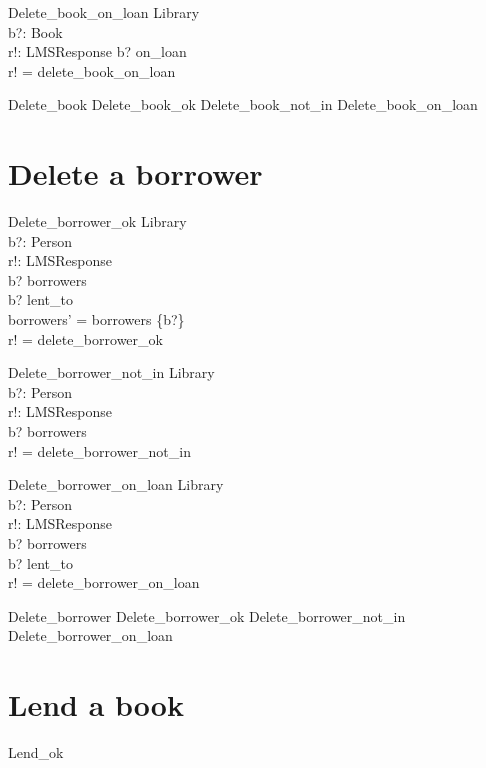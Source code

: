 \documentclass[11pt, fuzz]{article}
\begin{document}
\begin{schema}{Delete\_book\_on\_loan}
    \Xi Library     \\
    b?: Book        \\
    r!: LMSResponse
\where
    b? \in on\_loan             \\
    r! = delete\_book\_on\_loan \\
\end{schema}

\begin{zed}
    Delete\_book  Delete\_book\_ok \lor Delete\_book\_not\_in \lor Delete\_book\_on\_loan
\end{zed}


\section{Delete a borrower}


\begin{schema}{Delete\_borrower\_ok}
    \Delta Library  \\
    b?: Person      \\
    r!: LMSResponse \\
\where
    b? \in borrowers                        \\
    b? \notin \ran lent\_to                 \\
    borrowers' = borrowers \setminus \{b?\} \\
    r! = delete\_borrower\_ok               \\
\end{schema}

\begin{schema}{Delete\_borrower\_not\_in}
    \Xi Library     \\
    b?: Person      \\
    r!: LMSResponse \\
\where
    b? \notin borrowers            \\
    r! = delete\_borrower\_not\_in \\
\end{schema}

\begin{schema}{Delete\_borrower\_on\_loan}
    \Xi Library     \\
    b?: Person      \\
    r!: LMSResponse \\
\where
    b? \in borrowers                        \\
    b? \in \ran lent\_to                    \\
    r! = delete\_borrower\_on\_loan         \\
\end{schema}

\begin{zed}
    Delete\_borrower  Delete\_borrower\_ok \lor Delete\_borrower\_not\_in \lor \\ Delete\_borrower\_on\_loan
\end{zed}


\section{Lend a book}

\begin{schema}{Lend\_ok}

\end{schema}
\end{document}
